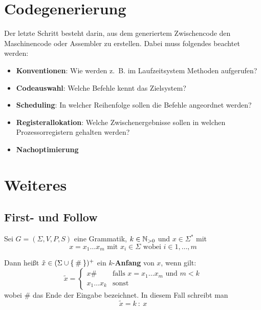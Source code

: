 \section{Codegenerierung}
Der letzte Schritt besteht darin, aus dem generiertem Zwischencode den 
Maschinencode oder Assembler zu erstellen. Dabei muss folgendes beachtet werden:
\begin{itemize}
    \item \textbf{Konventionen}: Wie werden z.~B. im Laufzeitsystem Methoden aufgerufen?
    \item \textbf{Codeauswahl}: Welche Befehle kennt das Zielsystem?
    \item \textbf{Scheduling}: In welcher Reihenfolge sollen die Befehle angeordnet werden?
    \item \textbf{Registerallokation}: Welche Zwischenergebnisse sollen in welchen Prozessorregistern gehalten werden?
    \item \textbf{Nachoptimierung}
\end{itemize}

\section{Weiteres}
\subsection{First- und Follow}
\begin{definition}[$k$-Anfang]%
    Sei $G = (\Sigma, V, P, S)$ eine Grammatik, $k \in \mathbb{N}_{> 0}$ und
    $x \in \Sigma^*$ mit
    \[x = x_1 \dots x_m \text{ mit } x_i \in \Sigma \text{ wobei } i \in 1, \dots, m\]

    Dann heißt $\tilde{x} \in (\Sigma \cup \Set{\#})^+$ ein $k$-\textbf{Anfang} von $x$,
    wenn gilt:
    \[\tilde{x} = 
    \begin{cases}
        x\#           &\text{falls } x = x_1 \dots x_m \text{ und } m < k\\
        x_1 \dots x_k &\text{sonst}
    \end{cases}\]
    wobei $\#$ das Ende der Eingabe bezeichnet. In diesem Fall schreibt man
    \[ \tilde{x} = k\ :\ x\]
\end{definition}

